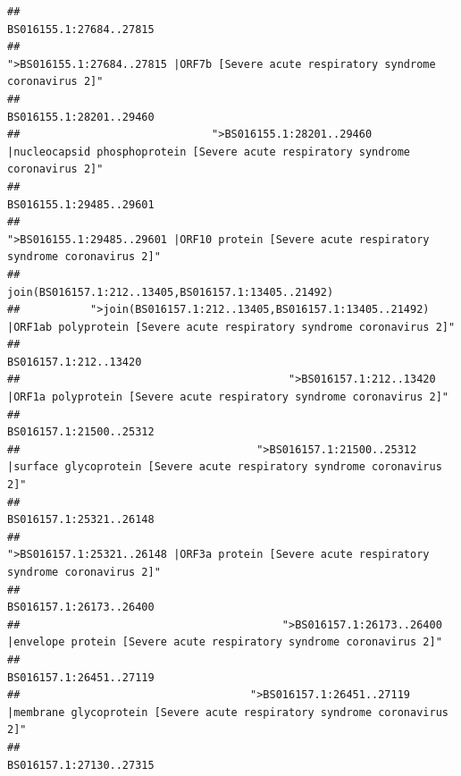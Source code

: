 \documentclass[
]{article}
\begin{document}
\begin{verbatim}
##                                                                                                                BS016155.1:27684..27815 
##                                                    ">BS016155.1:27684..27815 |ORF7b [Severe acute respiratory syndrome coronavirus 2]" 
##                                                                                                                BS016155.1:28201..29460 
##                              ">BS016155.1:28201..29460 |nucleocapsid phosphoprotein [Severe acute respiratory syndrome coronavirus 2]" 
##                                                                                                                BS016155.1:29485..29601 
##                                            ">BS016155.1:29485..29601 |ORF10 protein [Severe acute respiratory syndrome coronavirus 2]" 
##                                                                                    join(BS016157.1:212..13405,BS016157.1:13405..21492) 
##           ">join(BS016157.1:212..13405,BS016157.1:13405..21492) |ORF1ab polyprotein [Severe acute respiratory syndrome coronavirus 2]" 
##                                                                                                                  BS016157.1:212..13420 
##                                          ">BS016157.1:212..13420 |ORF1a polyprotein [Severe acute respiratory syndrome coronavirus 2]" 
##                                                                                                                BS016157.1:21500..25312 
##                                     ">BS016157.1:21500..25312 |surface glycoprotein [Severe acute respiratory syndrome coronavirus 2]" 
##                                                                                                                BS016157.1:25321..26148 
##                                            ">BS016157.1:25321..26148 |ORF3a protein [Severe acute respiratory syndrome coronavirus 2]" 
##                                                                                                                BS016157.1:26173..26400 
##                                         ">BS016157.1:26173..26400 |envelope protein [Severe acute respiratory syndrome coronavirus 2]" 
##                                                                                                                BS016157.1:26451..27119 
##                                    ">BS016157.1:26451..27119 |membrane glycoprotein [Severe acute respiratory syndrome coronavirus 2]" 
##                                                                                                                BS016157.1:27130..27315 

\end{verbatim}
\end{document}
